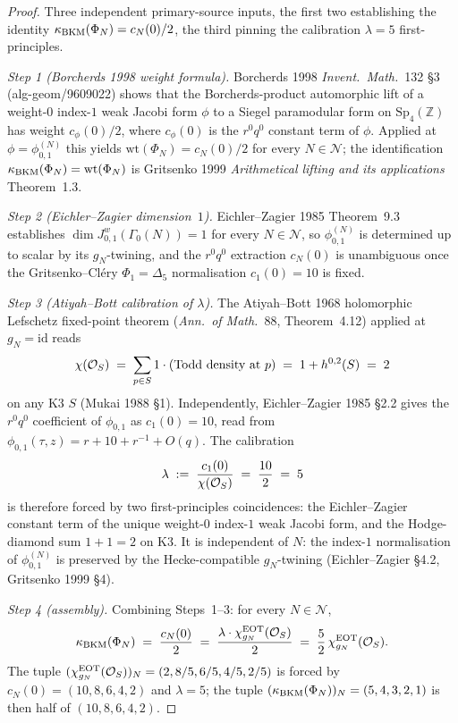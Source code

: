 \begin{proof}
Three independent primary-source inputs, the first two establishing the
identity $\kappa_{\mathrm{BKM}}(\Phi_N) = c_N(0)/2$, the third pinning the
calibration $\lambda = 5$ first-principles.

\emph{Step 1 (Borcherds 1998 weight formula).} Borcherds 1998
\emph{Invent.\ Math.}~132 \S3 (alg-geom/9609022) shows that the
Borcherds-product automorphic lift of a weight-$0$ index-$1$ weak Jacobi
form $\phi$ to a Siegel paramodular form on $\mathrm{Sp}_4(\mathbb{Z})$
has weight $c_\phi(0)/2$, where $c_\phi(0)$ is the $r^0 q^0$ constant
term of $\phi$. Applied at $\phi = \phi_{0,1}^{(N)}$ this yields
$\mathrm{wt}(\Phi_N) = c_N(0)/2$ for every $N \in \mathcal{N}$; the
identification $\kappa_{\mathrm{BKM}}(\Phi_N) = \mathrm{wt}(\Phi_N)$ is
Gritsenko 1999 \emph{Arithmetical lifting and its applications}
Theorem~1.3.

\emph{Step 2 (Eichler--Zagier dimension~$1$).} Eichler--Zagier 1985
Theorem~9.3 establishes $\dim J^w_{0,1}(\Gamma_0(N)) = 1$ for every
$N \in \mathcal{N}$, so $\phi_{0,1}^{(N)}$ is determined up to scalar
by its $g_N$-twining, and the $r^0 q^0$ extraction $c_N(0)$ is
unambiguous once the Gritsenko--Cl\'ery $\Phi_1 = \Delta_5$ normalisation
$c_1(0) = 10$ is fixed.

\emph{Step 3 (Atiyah--Bott calibration of $\lambda$).} The Atiyah--Bott
1968 holomorphic Lefschetz fixed-point theorem
(\emph{Ann.\ of Math.}~88, Theorem~4.12) applied at $g_N = \mathrm{id}$
reads
\[
  \chi(\mathcal{O}_S) \;=\; \sum_{p \in S} 1 \cdot (\text{Todd density at }p)
    \;=\; 1 + h^{0,2}(S) \;=\; 2
\]
on any K3 $S$ (Mukai 1988 \S1). Independently, Eichler--Zagier 1985
\S2.2 gives the $r^0 q^0$ coefficient of $\phi_{0,1}$ as
$c_1(0) = 10$, read from $\phi_{0,1}(\tau, z) = r + 10 + r^{-1} + O(q)$.
The calibration
\[
  \lambda \;:=\; \frac{c_1(0)}{\chi(\mathcal{O}_S)} \;=\; \frac{10}{2} \;=\; 5
\]
is therefore forced by two first-principles coincidences: the
Eichler--Zagier constant term of the unique weight-$0$ index-$1$ weak
Jacobi form, and the Hodge-diamond sum $1 + 1 = 2$ on K3. It is
independent of $N$: the index-$1$ normalisation of $\phi_{0,1}^{(N)}$
is preserved by the Hecke-compatible $g_N$-twining
(Eichler--Zagier \S4.2, Gritsenko 1999 \S4).

\emph{Step 4 (assembly).} Combining Steps~1--3: for every
$N \in \mathcal{N}$,
\[
  \kappa_{\mathrm{BKM}}(\Phi_N) \;=\; \frac{c_N(0)}{2}
    \;=\; \frac{\lambda \cdot \chi_{g_N}^{\mathrm{EOT}}(\mathcal{O}_S)}{2}
    \;=\; \frac{5}{2}\,\chi_{g_N}^{\mathrm{EOT}}(\mathcal{O}_S).
\]
The tuple $(\chi_{g_N}^{\mathrm{EOT}}(\mathcal{O}_S))_N = (2, 8/5, 6/5, 4/5, 2/5)$
is forced by $c_N(0) = (10, 8, 6, 4, 2)$ and $\lambda = 5$;
the tuple $(\kappa_{\mathrm{BKM}}(\Phi_N))_N = (5, 4, 3, 2, 1)$ is then
half of $(10, 8, 6, 4, 2)$.\qedhere
\end{proof}

